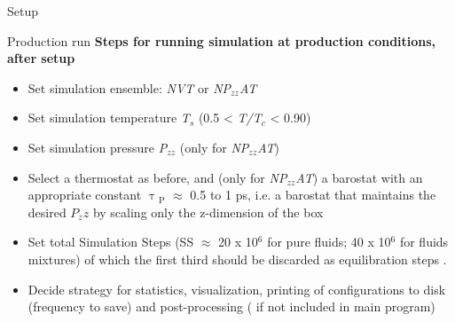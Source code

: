 \documentclass[9pt,bestpractices]{livecoms}
\begin{document}
\begin{Checklists*}[p!]
\begin{checklist}{Setup}
\end{checklist}

\begin{checklist}{Production run}
\textbf{Steps for running simulation at production conditions, after setup}
\begin{itemize}
\item Set simulation ensemble: \textit{NVT} or \textit{NP}$_{zz}$\textit{AT} \\
\item Set simulation temperature \textit{T}$_{s}$ (0.5 {\textless} \textit{T/T}$_{c}$ {\textless} 0.90)  \\
\item Set simulation pressure \textit{P}$_{zz}$ (only for \textit{NP}$_{zz}$\textit{AT}) \\
\item Select a thermostat as before, and (only for \textit{NP}$_{zz}$\textit{AT}) a barostat with an appropriate constant ${\uptau}$$_{\mathrm{P}}$ ${\approx}$ 0.5 to 1 ps, i.e. a barostat that maintains the desired $P_zz$ by scaling only the z-dimension of the box \\
\item Set total Simulation Steps (SS ${\approx}$ 20 x 10$^{6}$ for pure fluids; 40 x 10$^{6}$ for fluids mixtures) of which the first third should be discarded as equilibration steps . \\
\item Decide strategy for statistics, visualization, printing of configurations to disk (frequency to save) and post-processing ( if not included in main program)   \\
\end{itemize}
\end{checklist}


\end{Checklists*}
\end{document}
